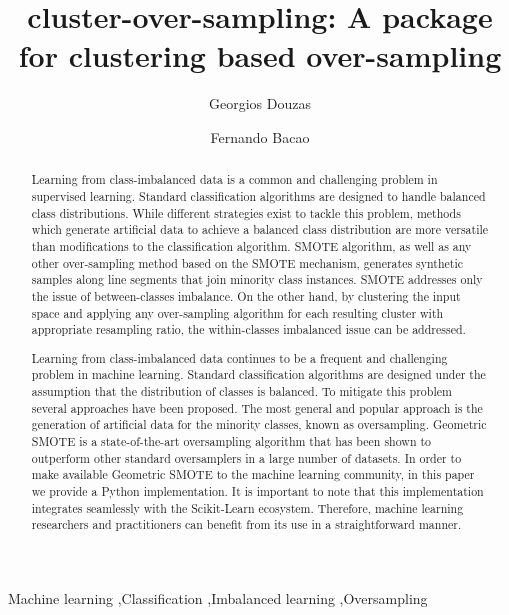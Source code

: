 \documentclass[preprint,12pt, a4paper]{elsarticle}
\begin{document}
\begin{frontmatter}

\title{cluster-over-sampling: A package for clustering based over-sampling}

\author{Georgios Douzas}

\author{Fernando Bacao}

\address{NOVA Information Management School, Universidade Nova de Lisboa}


\begin{abstract}
	Learning from class-imbalanced data is a common and challenging
	problem in supervised learning. Standard classification algorithms are
	designed to handle balanced class distributions. While different strategies
	exist to tackle this problem, methods which generate artificial data to achieve a balanced class distribution are more versatile than modifications to the classification algorithm. SMOTE algorithm, as well as any other
	over-sampling method based on the SMOTE mechanism, generates synthetic samples along line segments that join minority class instances. SMOTE addresses only the issue of between-classes imbalance. On the other hand, by clustering the input space and applying any over-sampling algorithm for each resulting cluster with appropriate resampling ratio, the within-classes imbalanced issue can be addressed.
	
	Learning from class-imbalanced data continues to be a frequent and challenging problem in machine learning. Standard classification algorithms are designed under the assumption that the distribution of classes is balanced. To mitigate this problem several approaches have been proposed. The most general and popular approach is the generation of artificial data for the minority classes, known as oversampling. Geometric SMOTE is a state-of-the-art oversampling algorithm that has been shown to outperform other standard oversamplers in a large number of datasets. In order to make available Geometric SMOTE to the machine learning community, in this paper we provide a Python implementation. It is important to note that this implementation integrates seamlessly with the Scikit-Learn ecosystem. Therefore, machine learning researchers and practitioners can benefit from its use in a straightforward manner.
\end{abstract}

\begin{keyword}
Machine learning \sep Classification \sep Imbalanced learning \sep Oversampling
\end{keyword}

\end{frontmatter}
\end{document}
